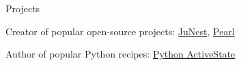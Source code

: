 \begin{cvlist}{Projects}
  \item[\textbullet] Creator of popular open-source projects:
  \href{https://github.com/fsquillace/junest}{JuNest}, \href{https://github.com/pearl-core/pearl}{Pearl}
  \item[\textbullet] Author of popular Python recipes:
  \href{https://code.activestate.com/recipes/users/4174931/}{Python ActiveState}
\end{cvlist}
